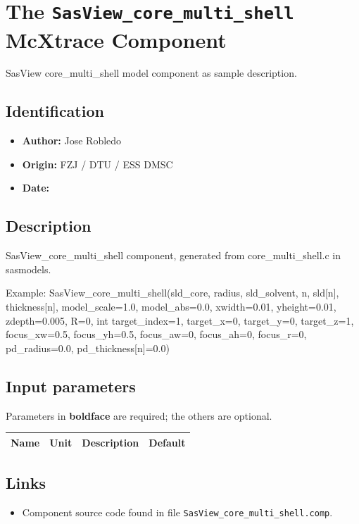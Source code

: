 \section{The \texttt{SasView\_core\_multi\_shell} McXtrace Component}
SasView core\_multi\_shell model component as sample description.

\subsection*{Identification}
\begin{itemize}
  \item \textbf{Author:} Jose Robledo
  \item \textbf{Origin:} FZJ / DTU / ESS DMSC
  \item \textbf{Date:} 
\end{itemize}

\subsection*{Description}
SasView\_core\_multi\_shell component, generated from core\_multi\_shell.c in sasmodels.

Example: SasView\_core\_multi\_shell(sld\_core, radius, sld\_solvent, n, sld[n], thickness[n], model\_scale=1.0, model\_abs=0.0, xwidth=0.01, yheight=0.01, zdepth=0.005, R=0, int target\_index=1, target\_x=0, target\_y=0, target\_z=1, focus\_xw=0.5, focus\_yh=0.5, focus\_aw=0, focus\_ah=0, focus\_r=0, pd\_radius=0.0, pd\_thickness[n]=0.0)

\subsection*{Input parameters}
Parameters in \textbf{boldface} are required; the others are optional.

\begin{longtable}{p{}p{}p{}p{}}
\toprule
\textbf{Name} & \textbf{Unit} & \textbf{Description} & \textbf{Default} \\
\midrule
\endhead
\bottomrule
\end{longtable}

\subsection*{Links}
\begin{itemize}
  \item Component source code found in file \texttt{SasView\_core\_multi\_shell.comp}.
\end{itemize}
